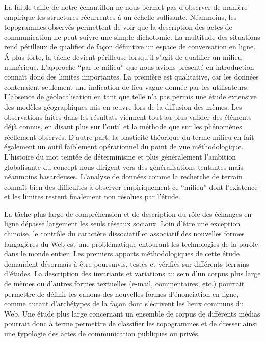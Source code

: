 La faible taille de notre échantillon ne nous permet pas d{\textquoteright}observer de manière empirique les structures récurrentes à un échelle suffisante. Néanmoins, les topogrammes observés permettent de voir que la description des actes de communication ne peut suivre une simple dichotomie. La multitude des situations rend périlleux de qualifier de fa\c{c}on définitive un espace de conversation en ligne. \'A plus forte, la tâche devient périlleuse lorsqu'il s'agit de qualifier un milieu numérique. L'approche ``par le milieu'' que nous avions présenté en introduction connaît donc des limites importantes. La première est qualitative, car les données contenaient seulement une indication de lieu vague donnée par les utilisateurs. L'absence de géolocalisation en tant que telle n'a pas permis une étude extensive des modèles géographiques mis en œuvre lors de la diffusion des mèmes. Les observations faites dans les résultats viennent tout au plus valider des éléments déjà connus, en disant plus sur l'outil et la méthode que sur les phénomènes réellement observés. D'autre part, la plasticité théorique du terme milieu en fait également un outil faiblement opérationnel du point de vue méthodologique. L'histoire du mot teintée de déterminisme et plus généralement l'ambition globalisante du concept nous dirigent vers des généralisations tentantes mais néanmoins hasardeuses. L'analyse de données comme la recherche de terrain connaît bien des difficultés à observer empiriquement ce ``milieu'' dont l'existence et les limites restent finalement non résolues par l'étude. 


La t\^ache plus large de compréhension et de description du r\^ole des échanges en ligne dépasse largement les seuls réseaux sociaux. Loin d{\textquoteright}être une exception chinoise, le contr\^ole du caractère dissociatif et associatif des nouvelles formes langagières du Web est une problématique entourant les technologies de la parole dans le monde entier. Les premiers apports méthodologiques de cette étude demandent désormais à être poursuivis, testés et vérifiés sur différents terrains d{\textquoteright}études. La description des invariants et variations au sein d{\textquoteright}un corpus plus large de mèmes ou d{\textquoteright}autres formes textuelles (e-mail, commentaires, etc.) pourrait permettre de définir les canons des nouvelles formes d{\textquoteright}énonciation en ligne, comme autant d{\textquoteright}archétypes de la fa\c{c}on dont s{\textquoteright}écrivent les lieux communs du Web. Une étude plus large concernant un ensemble de corpus de différents médias pourrait donc à terme permettre de classifier les topogrammes et de dresser ainsi une typologie des actes de communication publiques ou privés. 

